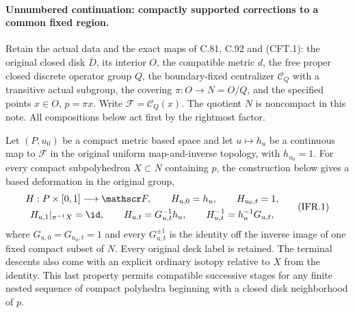 \paragraph{Unnumbered continuation: compactly supported corrections to a common fixed region.}
Retain the actual data and the exact maps of C.81, C.92 and (CFT.1):
the original closed disk $\overline D$, its interior $O$, the compatible
metric $d$, the free proper closed discrete operator group $Q$, the
boundary-fixed centralizer $\mathscr C_Q$ with a transitive actual
subgroup, the covering $\pi:O\to N=O/Q$, and the specified points
$x\in O$, $p=\pi x$. Write $\mathscr F=\mathscr C_Q(x)$.
The quotient $N$ is noncompact in this note. All compositions below
act first by the rightmost factor.

Let $(P,u_0)$ be a compact metric based space and let
$u\mapsto h_u$ be a continuous map to $\mathscr F$ in the original
uniform map-and-inverse topology, with $h_{u_0}=1$.
For every compact subpolyhedron $X\subset N$ containing $p$, the
construction below gives a based deformation in the original group,
\[
\begin{gathered}
 H:P\times[0,1]\longrightarrow\mathscr F,\qquad
 H_{u,0}=h_u,\qquad H_{u_0,t}=1,\\
 H_{u,1}|_{\pi^{-1}X}=\id,\qquad
 H_{u,t}=G_{u,t}^{-1}h_u,\qquad
 H_{u,t}^{-1}=h_u^{-1}G_{u,t},
\end{gathered}                                                    \tag{IFR.1}
\]
where $G_{u,0}=G_{u_0,t}=1$ and every $G_{u,t}^{\pm1}$ is the
identity off the inverse image of one fixed compact subset of $N$.
Every original deck label is retained. The terminal descents also
come with an explicit ordinary isotopy relative to $X$ from the
identity. This last property permits compatible successive stages
for any finite nested sequence of compact polyhedra beginning with
a closed disk neighborhood of $p$.

